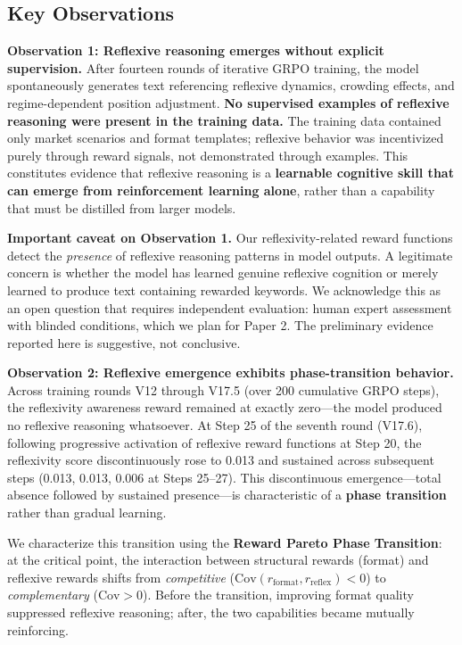 \documentclass[11pt,a4paper]{article}
\begin{document}
\subsection{Key Observations}

\textbf{Observation 1: Reflexive reasoning emerges without explicit supervision.} After fourteen rounds of iterative GRPO training, the model spontaneously generates text referencing reflexive dynamics, crowding effects, and regime-dependent position adjustment. \textbf{No supervised examples of reflexive reasoning were present in the training data.} The training data contained only market scenarios and format templates; reflexive behavior was incentivized purely through reward signals, not demonstrated through examples. This constitutes evidence that reflexive reasoning is a \textbf{learnable cognitive skill that can emerge from reinforcement learning alone}, rather than a capability that must be distilled from larger models.

\textbf{Important caveat on Observation 1.} Our reflexivity-related reward functions detect the \textit{presence} of reflexive reasoning patterns in model outputs. A legitimate concern is whether the model has learned genuine reflexive cognition or merely learned to produce text containing rewarded keywords. We acknowledge this as an open question that requires independent evaluation: human expert assessment with blinded conditions, which we plan for Paper 2. The preliminary evidence reported here is suggestive, not conclusive.

\textbf{Observation 2: Reflexive emergence exhibits phase-transition behavior.} Across training rounds V12 through V17.5 (over 200 cumulative GRPO steps), the reflexivity awareness reward remained at exactly zero---the model produced no reflexive reasoning whatsoever. At Step 25 of the seventh round (V17.6), following progressive activation of reflexive reward functions at Step 20, the reflexivity score discontinuously rose to 0.013 and sustained across subsequent steps (0.013, 0.013, 0.006 at Steps 25--27). This discontinuous emergence---total absence followed by sustained presence---is characteristic of a \textbf{phase transition} rather than gradual learning.

We characterize this transition using the \textbf{Reward Pareto Phase Transition}: at the critical point, the interaction between structural rewards (format) and reflexive rewards shifts from \textit{competitive} ($\text{Cov}(r_{\text{format}}, r_{\text{reflex}}) < 0$) to \textit{complementary} ($\text{Cov} > 0$). Before the transition, improving format quality suppressed reflexive reasoning; after, the two capabilities became mutually reinforcing.
\end{document}
